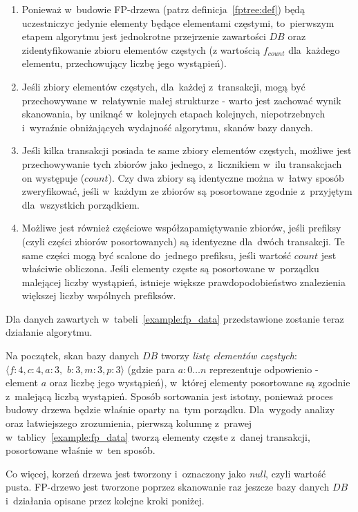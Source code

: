 \begin{enumerate}
	\item Ponieważ w~budowie FP-drzewa (patrz definicja~\ref{fptree:def}) będą uczestniczyc jedynie elementy będące elementami częstymi, to~pierwszym etapem algorytmu jest jednokrotne przejrzenie zawartości $DB$ oraz zidentyfikowanie zbioru elementów częstych (z wartością $f_{count}$ dla~każdego elementu, przechowujący liczbę jego wystąpień).
	\item Jeśli zbiory elementów częstych, dla~każdej z~transakcji, mogą być przechowywane w~relatywnie małej strukturze - warto jest zachować wynik skanowania, by uniknąć w~kolejnych etapach kolejnych, niepotrzebnych i~wyraźnie obniżających wydajność algorytmu, skanów bazy danych.
	\item Jeśli kilka transakcji posiada te same zbiory elementów częstych, możliwe jest przechowywanie tych zbiorów jako jednego, z~licznikiem w~ilu transakcjach on występuje ($count$). Czy dwa zbiory są identyczne można w~łatwy sposób zweryfikować, jeśli w~każdym ze zbiorów są posortowane zgodnie z~przyjętym dla~wszystkich porządkiem.
	\item Możliwe jest również częściowe współzapamiętywanie zbiorów, jeśli prefiksy (czyli części zbiorów posortowanych) są identyczne dla~dwóch transakcji. Te same części mogą być scalone do~jednego prefiksu, jeśli wartość $count$ jest właściwie obliczona. Jeśli elementy częste są posortowane w~porządku malejącej liczby wystąpień, istnieje większe prawdopodobieństwo znalezienia większej liczby wspólnych prefiksów.
\end{enumerate}

Dla danych zawartych w~tabeli~\ref{example:fp_data} przedstawione zostanie teraz działanie algorytmu.

Na początek, skan bazy danych $DB$ tworzy \emph{listę elementów częstych}: $\langle f: 4, c: 4, a: 3,$ $ b: 3, m: 3, p: 3\rangle$ (gdzie para $a:0\dots n$ reprezentuje odpowienio - element $a$ oraz liczbę jego wystąpień), w~której elementy posortowane są zgodnie z~malejącą liczbą wystąpień. Sposób sortowania jest istotny, ponieważ proces budowy drzewa będzie właśnie oparty na~tym porządku. Dla~wygody analizy oraz łatwiejszego zrozumienia, pierwszą kolumnę z~prawej w~tablicy~\ref{example:fp_data} tworzą elementy częste z~danej transakcji, posortowane właśnie w~ten sposób.

Co więcej, korzeń drzewa jest tworzony i~oznaczony jako \emph{null}, czyli wartość pusta. FP-drzewo jest tworzone poprzez skanowanie raz jeszcze bazy danych $DB$ i~działania opisane przez kolejne kroki poniżej.


